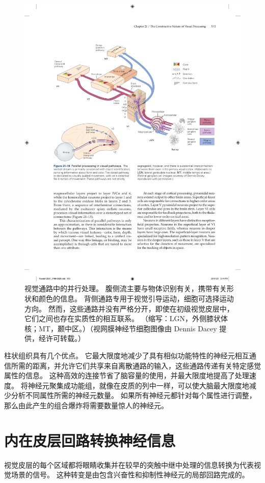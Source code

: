 \begin{figure}[htbp]
	\centering
	\includegraphics[width=1.0\linewidth]{chap21/fig_21_14}
	\caption{视觉通路中的并行处理。 
		腹侧流主要与物体识别有关，携带有关形状和颜色的信息。 
		背侧通路专用于视觉引导运动，细胞可选择运动方向。 
		然而，这些通路并没有严格分开，即使在初级视觉皮层中，它们之间也存在实质性的相互联系。 （缩写：LGN，外侧膝状体核；MT，颞中区。）（视网膜神经节细胞图像由 Dennis Dacey 提供，经许可转载。）}
	\label{fig:21_14}
\end{figure}


柱状组织具有几个优点。 
它最大限度地减少了具有相似功能特性的神经元相互通信所需的距离，并允许它们共享来自离散通路的输入，这些通路传递有关特定感觉属性的信息。 
这种高效的连接节省了脑容量的使用，并最大限度地提高了处理速度。 
将神经元聚集成功能组，就像在皮质的列中一样，可以使大脑最大限度地减少分析不同属性所需的神经元数量。 
如果所有神经元都针对每个属性进行调整，那么由此产生的组合爆炸将需要数量惊人的神经元。


\section{内在皮层回路转换神经信息}
视觉皮层的每个区域都将眼睛收集并在较早的突触中继中处理的信息转换为代表视觉场景的信号。 
这种转变是由包含兴奋性和抑制性神经元的局部回路完成的。


